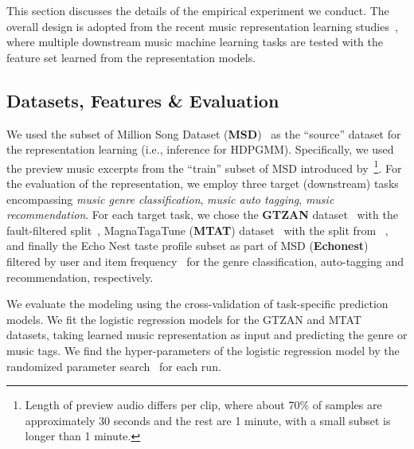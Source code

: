 \documentclass{article}
\begin{document}
This section discusses the details of the empirical experiment we conduct. The overall design is adopted from the recent music representation learning studies~\cite{DBLP:conf/ismir/ChoiFSC17,DBLP:journals/nca/KimULH20,DBLP:conf/ismir/SpijkervetB21}, where multiple downstream music machine learning tasks are tested with the feature set learned from the representation models.

\subsection{Datasets, Features \& Evaluation}\label{sec:experimental_setup:datasets_evaluation}

We used the subset of Million Song Dataset (\textbf{MSD})~\cite{Bertin-Mahieux2011} as the ``source'' dataset for the representation learning (i.e., inference for HDPGMM). Specifically, we used the preview music excerpts from the ``train'' subset of MSD introduced by~\cite{DBLP:conf/ismir/PonsNPSES18,app8010150}\footnote{Length of preview audio differs per clip, where about 70\% of samples are approximately 30 seconds and the rest are 1 minute, with a small subset is longer than 1 minute.}.
For the evaluation of the representation, we employ three target (downstream) tasks encompassing \emph{music genre classification}, \emph{music auto tagging}, \emph{music recommendation}. For each target task, we chose the \textbf{GTZAN} dataset~\cite{DBLP:journals/taslp/TzanetakisC02} with the fault-filtered split~\cite{DBLP:journals/tmm/KereliukSL15}, MagnaTagaTune (\textbf{MTAT}) dataset~\cite{DBLP:conf/ismir/LawWMBD09} with the split from ~\cite{lee_multi-level_2017}, and finally the Echo Nest taste profile subset as part of MSD (\textbf{Echonest})~\cite{Bertin-Mahieux2011} filtered by user and item frequency~\cite{DBLP:conf/www/LiangKHJ18} for the genre classification, auto-tagging and recommendation, respectively.

We evaluate the modeling using the cross-validation of task-specific prediction models. We fit the logistic regression models for the GTZAN and MTAT datasets, taking learned music representation as input and predicting the genre or music tags. We find the hyper-parameters of the logistic regression model by the randomized parameter search~\cite{DBLP:journals/jmlr/BergstraB12} for each run.
\end{document}
